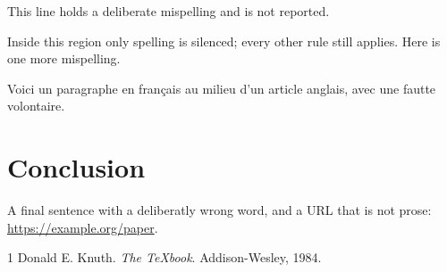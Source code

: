 \documentclass[11pt]{article}
\begin{document}
This line holds a deliberate mispelling and is not reported.

Inside this region only spelling is silenced; every other rule still applies.
Here is one more mispelling.

Voici un paragraphe en français au milieu d'un article anglais, avec une
fautte volontaire.

\section{Conclusion}

A final sentence with a deliberatly wrong word, and a URL that is not prose:
\url{https://example.org/paper}.

\begin{thebibliography}{1}
  Donald E. Knuth. \emph{The \TeX book}. Addison-Wesley, 1984.
\end{thebibliography}
\end{document}

